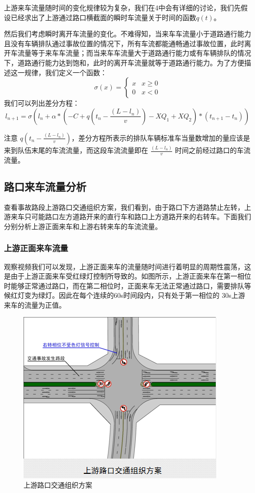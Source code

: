 \documentclass{cumcmart}
\begin{document}
上游来车流量随时间的变化规律较为复杂，我们在4中会有详细的讨论，我们先假设已经求出了上游通过路口横截面的瞬时车流量关于时间的函数$ {q(t)}$。

然后我们考虑瞬时离开车流量的变化。不难得知，当来车车流量小于道路通行能力且没有车辆排队通过事故位置的情况下，所有车流都能通畅通过事故位置，此时离开车流量等于来车车流量；而当来车车流量大于道路通行能力或有车辆排队的情况下，道路通行能力达到饱和，此时的离开车流量就等于道路通行能力。为了方便描述这一规律，我们定义一个函数：
\begin{equation}
\sigma \left( x \right) = \begin{cases}
x &x \ge 0\\
0& x < 0
\end{cases}
\end{equation}
我们可以列出差分方程：
\begin{equation}
{l_{n + 1}} = \sigma \left( {{l_n} + \alpha *\left( { - C + q\left( {{t_n} - \frac{{\left( {L - {l_n}} \right)}}{v}} \right) - X{Q_1} + X{Q_2}} \right)*\left( {{t_{n + 1}} - {t_n}} \right)} \right)
\end{equation}

注意 $q\left( t_{n}-\frac{\left(  {L-}l_{n} \right)}{v}
\right)$，差分方程所表示的排队车辆标准车当量数增加的量应该是来到队伍末尾的车流流量，而这段车流流量即在
$\frac{\left( {L-}l_{n} \right)}{v}$ 时间之前经过路口的车流流量。


\subsection{路口来车流量分析}
查看事故路段上游路口交通组织方案，我们看到，由于路口下方道路禁止左转，上游来车只可能路口左方道路开来的直行车和路口上方道路开来的右转车。下面我们分别分析上游正面来车和上游右转来车的车流流量。

\subsubsection{上游正面来车流量}
观察视频我们可以发现，上游正面来车的流量随时间进行着明显的周期性震荡，这是由于上游正面来车受红绿灯控制所导致的。如图所示，上游正面来车在第一相位时能够正常通过路口，而在第二相位时，正面来车无法正常通过路口，需要排队等候红灯变为绿灯。因此在每个连续的60s时间段内，只有处于第一相位的
30s上游来车的流量为正值。
\begin{figure}[h]
\centering
\includegraphics[width=.6\textwidth]{fig2}
\caption{上游路口交通组织方案}
\end{figure}
\end{document}

